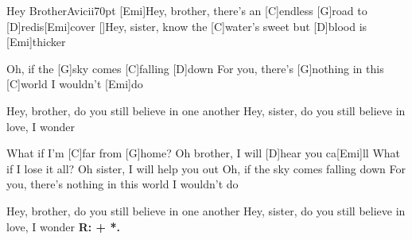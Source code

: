 \begin{song}{Hey Brother}{Avicii}{70pt}
%
[Emi]Hey, brother, there's an [C]endless [G]road to [D]redis[Emi]cover
[]Hey, sister, know the [C]water's sweet but [D]blood is [Emi]thicker

\chorus%
[D]Oh, if the [G]sky comes [C]falling [D]down
For you, there's [G]nothing in this [C]world I wouldn't [Emi]do

%
Hey, brother, do you still believe in one another
Hey, sister, do you still believe in love, I wonder
\repchor

\verse{*}%
What if I'm [C]far from [G]home?
Oh brother, I will [D]hear you ca[Emi]ll
What if I lose it all?
Oh sister, I will help you out
Oh, if the sky comes falling down
For you, there's nothing in this world I wouldn't do

%
Hey, brother, do you still believe in one another
Hey, sister, do you still believe in love, I wonder
{\Large\bfseries R: + *.}
\end{song}

